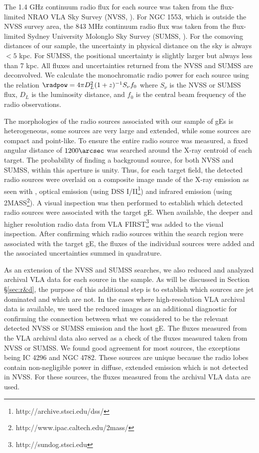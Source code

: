 \documentclass{emulateapj}
\begin{document}
The 1.4 GHz continuum radio flux for each source was taken from the
flux-limited NRAO VLA Sky Survey (NVSS, \citealt{nvss}). For NGC 1553,
which is outside the NVSS survey area, the 843 MHz continuum radio
flux was taken from the flux-limited Sydney University Molonglo Sky
Survey (SUMSS, \citealt{sumss1, sumss2}). For the comoving distances
of our sample, the uncertainty in physical distance on the sky is
always $< 5$ kpc. For SUMSS, the positional uncertainty is slightly
larger but always less than 7 kpc. All fluxes and uncertainties
returned from the NVSS and SUMSS are deconvolved. We calculate the
monochromatic radio power for each source using the relation $\radpow
= 4 \pi D_L^2 (1+z)^{-1} S_{\nu} f_0$ where $S_{\nu}$ is the NVSS or
SUMSS flux, $D_L$ is the luminosity distance, and $f_0$ is the central
beam frequency of the radio observations.

The morphologies of the radio sources associated with our sample of
gEs is heterogeneous, some sources are very large and extended, while
some sources are compact and point-like. To ensure the entire radio
source was measured, a fixed angular distance of $1200\arcsec$ was
searched around the X-ray centroid of each target. The probability of
finding a background source, for both NVSS and SUMSS, within this
aperture is unity. Thus, for each target field, the detected radio
sources were overlaid on a composite image made of the X-ray emission
as seen with \chandra, optical emission (using DSS
I/II\footnote{http://archive.stsci.edu/dss/}) and infrared emission
(using 2MASS\footnote{http://www.ipac.caltech.edu/2mass/}). A visual
inspection was then performed to establish which detected radio
sources were associated with the target gE. When available, the deeper
and higher resolution radio data from VLA
FIRST\footnote{http://sundog.stsci.edu} was added to the visual
inspection. After confirming which radio sources within the search
region were associated with the target gE, the fluxes of the
individual sources were added and the associated uncertainties summed
in quadrature.

As an extension of the NVSS and SUMSS searches, we also reduced and
analyzed archival VLA data for each source in the sample. As will be
discussed in Section \S\ref{sec:r&d}, the purpose of this additional
step is to establish which sources are jet dominated and which are
not. In the cases where high-resolution VLA archival data is
available, we used the reduced images as an additional diagnostic for
confirming the connection between what we considered to be the
relevant detected NVSS or SUMSS emission and the host gE. The fluxes
measured from the VLA archival data also served as a check of the
fluxes measured taken from NVSS or SUMSS. We found good agreement for
most sources, the exceptions being IC 4296 and NGC 4782. These sources
are unique because the radio lobes contain non-negligible power in
diffuse, extended emission which is not detected in NVSS. For these
sources, the fluxes measured from the archival VLA data are used.
\end{document}
